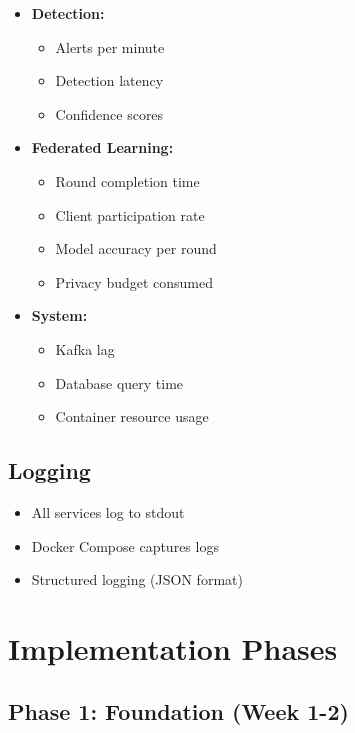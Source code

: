 \documentclass[12pt,a4paper]{article}
\begin{document}
\begin{itemize}[leftmargin=1cm,itemsep=0pt]
    \item \textbf{Detection:}
    \begin{itemize}
        \item Alerts per minute
        \item Detection latency
        \item Confidence scores
    \end{itemize}
    \item \textbf{Federated Learning:}
    \begin{itemize}
        \item Round completion time
        \item Client participation rate
        \item Model accuracy per round
        \item Privacy budget consumed
    \end{itemize}
    \item \textbf{System:}
    \begin{itemize}
        \item Kafka lag
        \item Database query time
        \item Container resource usage
    \end{itemize}
\end{itemize}

\subsection{Logging}

\begin{itemize}[leftmargin=1cm,itemsep=0pt]
    \item All services log to stdout
    \item Docker Compose captures logs
    \item Structured logging (JSON format)
\end{itemize}

\section{Implementation Phases}

\subsection{Phase 1: Foundation (Week 1-2)}
\end{document}
